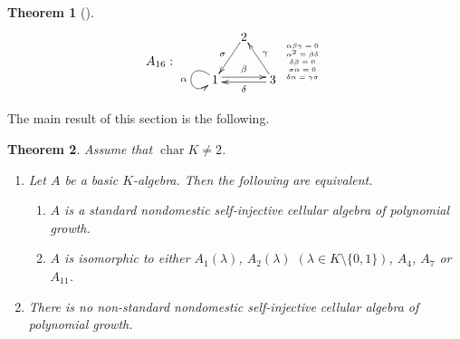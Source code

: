 \documentclass[12pt]{amsart}
\newtheorem{thm}{Theorem}[section]
\numberwithin{equation}{thm}
\newcommand\cha{\operatorname{char}}
\begin{document}
{\begin{thm}[{\cite[Theorem, Theorem]{S}}]
\[\begin{array}{c}
A_{16}:
\begin{xy}
(0,-5) *[o]+{1}="A",(8,7) *[o]+{2}="B", (16,-5) *[o]+{3}="C", 
\ar @(lu,ld) "A";"A"_{\alpha} 
\ar "B";"A"_{\sigma}
\ar "C";"B"_{\gamma}
\ar @<2pt>"A";"C"^{\beta}
\ar @<2pt>"C";"A"^{\delta }
\end{xy}
{\tiny \begin{array}{c}
\alpha\beta\gamma=0 \\
\alpha^2=\beta\delta \\
\delta\beta=0 \\
\sigma\alpha=0\\
\delta\alpha=\gamma\sigma\\
\end{array}
}\\



\end{array}
\] 
\end{thm}



The main result of this section is the following.


\begin{thm}
\label{P main}
Assume that $\cha K\neq 2$.
\begin{enumerate} 
\item Let $A$ be a basic $K$-algebra. Then the following are equivalent.
\begin{enumerate}
\item $A$ is a standard nondomestic self-injective cellular algebra
 of polynomial growth.
\item $A$ is isomorphic to either $A_1(\lambda)$, $A_2(\lambda)$ 
$(\lambda\in K\setminus\{0,1\})$, $A_4$, $A_7$ or $A_{11}$.
\end{enumerate}

\item There is no non-standard nondomestic self-injective cellular algebra
 of polynomial growth. 
 \end{enumerate}
\end{thm}

}
\end{document}
